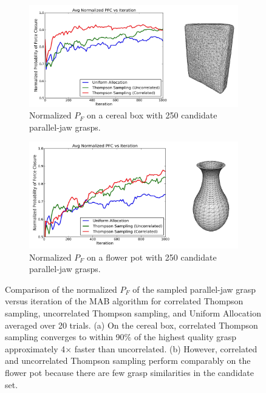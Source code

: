 
\begin{figure}[t!]
\centering
	\begin{subfigure}[b]{0.5\textwidth}
        \centering
        \includegraphics[scale=0.08]{figures/box_avg_reward_w_model.jpg}
        \caption{Normalized $P_F$ on a cereal box with 250 candidate parallel-jaw grasps.}
    \end{subfigure}
    \begin{subfigure}[b]{0.5\textwidth}
        \centering
        \includegraphics[scale=0.08]{figures/flowerpot_avg_reward_w_model.jpg}
        \caption{Normalized $P_F$ on a flower pot with 250 candidate parallel-jaw  grasps.}
    \end{subfigure}
\caption{Comparison of the normalized $P_F$ of the sampled parallel-jaw grasp versus iteration of the MAB algorithm for correlated Thompson sampling, uncorrelated Thompson sampling, and Uniform Allocation averaged over 20 trials. (a) On the cereal box, correlated Thompson sampling converges to within 90\% of the highest quality grasp approximately 4$\times$ faster than uncorrelated. (b) However, correlated and uncorrelated Thompson sampling perform comparably on the flower pot because there are few grasp similarities in the candidate set. }
\vspace*{-15pt}
\end{figure}


